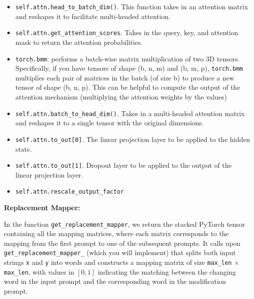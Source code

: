 \documentclass[11pt,addpoints,answers]{exam}
\begin{document}
\begin{questions}
\begin{itemize}
\begin{itemize}
    \item \lstinline{}
    \lstinline{self.attn.head_to_batch_dim()}. This function takes in an attention matrix and reshapes it to facilitate multi-headed attention.

    \item 
    \lstinline{self.attn.get_attention_scores}. Takes in the query, key, and attention mask to return the attention probabilities.

    

    \item \lstinline{torch.bmm}: performs a batch-wise matrix multiplication of two 3D tensors. Specifically, if you have tensors of shape (b, n, m) and (b, m, p), \lstinline{torch.bmm} multiplies each pair of matrices in the batch (of size b) to produce a new tensor of shape (b, n, p). This can be helpful to compute the output of the attention mechanism (multiplying the attention weights by the values)

    \item 
\lstinline{self.attn.batch_to_head_dim()}. Takes in a multi-headed attention matrix and reshapes it to a single tensor with the original dimensions.

\item 
\lstinline{self.attn.to_out[0]}. The linear projection layer to be applied to the hidden state.

\item 
\lstinline{self.attn.to_out[1]}. Dropout layer to be applied to the output of the linear projection layer.

\item 
\lstinline{self.attn.rescale_output_factor}
\end{itemize}



\end{itemize}


\textbf{Replacement Mapper:}

In the function \lstinline{get_replacement_mapper}, we return the stacked PyTorch tensor containing all the mapping matrices, where each matrix corresponds to the mapping from the first prompt to one of the subsequent prompts. It calls upon \lstinline{get_replacement_mapper_} (which you will implement) that splits both input strings \lstinline{x} and \lstinline{y} into words and constructs a mapping matrix of size \lstinline{max_len} $\times$ \lstinline{max_len}, with values in $[0,1]$ indicating the matching between the changing word in the input prompt and the corresponding word in the modification prompt.


\end{questions}
\end{document}
